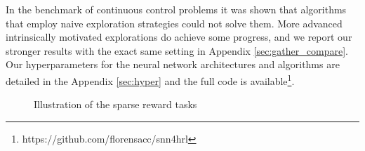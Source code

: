 \documentclass{article} %
\begin{document}
In the benchmark of continuous control problems \citep{duan2016benchmarking} it was shown that algorithms that employ naive exploration strategies could not solve them. More advanced intrinsically motivated explorations \citep{houthooft2016variational} do achieve some progress, and we report our stronger results with the exact same setting in Appendix \ref{sec:gather_compare}. Our hyperparameters for the neural network architectures and algorithms are detailed in the Appendix \ref{sec:hyper} and the full code is available\footnote{https://github.com/florensacc/snn4hrl}.

\begin{figure}[ht]
	\centering
	\vspace{-10pt}
	\caption{Illustration of the sparse reward tasks}
	\label{fig:snn_multimodal_MI}
\end{figure}
\end{document}
